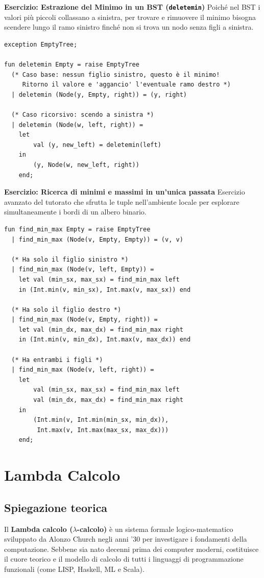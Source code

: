 \documentclass[12pt, a4paper]{article}
\begin{document}
\textbf{Esercizio: Estrazione del Minimo in un BST (\texttt{deletemin})}
Poiché nel BST i valori più piccoli collassano a sinistra, per trovare e rimuovere il minimo bisogna scendere lungo il ramo sinistro finché non si trova un nodo senza figli a sinistra.
\begin{verbatim}
exception EmptyTree;

fun deletemin Empty = raise EmptyTree
  (* Caso base: nessun figlio sinistro, questo è il minimo! 
     Ritorno il valore e 'aggancio' l'eventuale ramo destro *)
  | deletemin (Node(y, Empty, right)) = (y, right)
  
  (* Caso ricorsivo: scendo a sinistra *)
  | deletemin (Node(w, left, right)) =
    let
        val (y, new_left) = deletemin(left)
    in
        (y, Node(w, new_left, right))
    end;
\end{verbatim}

\newpage

\textbf{Esercizio: Ricerca di minimi e massimi in un'unica passata}
Esercizio avanzato del tutorato che sfrutta le tuple nell'ambiente locale per esplorare simultaneamente i bordi di un albero binario.
\begin{verbatim}
fun find_min_max Empty = raise EmptyTree
  | find_min_max (Node(v, Empty, Empty)) = (v, v)
  
  (* Ha solo il figlio sinistro *)
  | find_min_max (Node(v, left, Empty)) =
    let val (min_sx, max_sx) = find_min_max left
    in (Int.min(v, min_sx), Int.max(v, max_sx)) end
    
  (* Ha solo il figlio destro *)
  | find_min_max (Node(v, Empty, right)) =
    let val (min_dx, max_dx) = find_min_max right
    in (Int.min(v, min_dx), Int.max(v, max_dx)) end
    
  (* Ha entrambi i figli *)
  | find_min_max (Node(v, left, right)) =
    let 
        val (min_sx, max_sx) = find_min_max left
        val (min_dx, max_dx) = find_min_max right
    in 
        (Int.min(v, Int.min(min_sx, min_dx)), 
         Int.max(v, Int.max(max_sx, max_dx))) 
    end;
\end{verbatim}


\section{Lambda Calcolo}

\subsection{Spiegazione teorica}
Il \textbf{Lambda calcolo ($\lambda$-calcolo)} è un sistema formale logico-matematico sviluppato da Alonzo Church negli anni '30 per investigare i fondamenti della computazione. Sebbene sia nato decenni prima dei computer moderni, costituisce il cuore teorico e il modello di calcolo di tutti i linguaggi di programmazione funzionali (come LISP, Haskell, ML e Scala).
\end{document}
